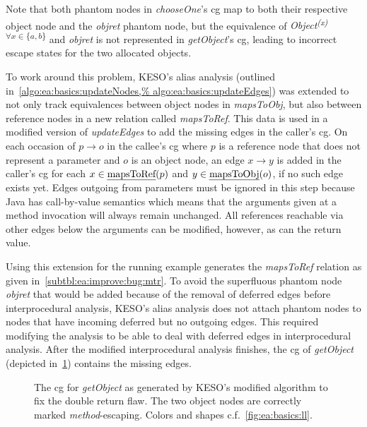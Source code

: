 			Note that both phantom nodes in \emph{chooseOne}'s \gls{cg} map to both their respective object node and the
			\emph{objret} phantom node, but the equivalence of \emph{Object\textsuperscript{(x) $\forall x \in \{a,b\}$}} and
			\emph{objret} is not represented in \emph{getObject}'s \gls{cg}, leading to incorrect escape states for the two
			allocated objects.

			To work around this problem, KESO's alias analysis (outlined in~\cref{algo:ea:basics:updateNodes,%
			algo:ea:basics:updateEdges}) was extended to not only track equivalences between object nodes in \emph{mapsToObj},
			but also between reference nodes in a new relation called \emph{mapsToRef}. This data is used in a modified
			version of \emph{updateEdges} to add the missing edges in the caller's \gls{cg}. On each occasion of
				$p \rightarrow o$
			in the callee's \gls{cg} where $p$ is a reference node that does not represent a parameter and $o$ is an object
			node, an edge
				$x \rightarrow y$
			is added in the caller's \gls{cg} for each
				$x \in \text{\emph{mapsToRef}}(p)$ and $y \in \text{\emph{mapsToObj}}(o)$,
			if no such edge exists yet. Edges outgoing from parameters must be ignored in this step because Java has
			call-by-value semantics which means that the arguments given at a method invocation will always remain unchanged.
			All references reachable via other edges below the arguments can be modified, however, as can the return value.

			Using this extension for the running example generates the \emph{mapsToRef} relation as given
			in~\cref{subtbl:ea:improve:bug:mtr}. To avoid the superfluous phantom node \emph{objret} that would be added
			because of the removal of deferred edges before interprocedural analysis, KESO's alias analysis does not attach
			phantom nodes to nodes that have incoming deferred but no outgoing edges. This required modifying the analysis to
			be able to deal with deferred edges in interprocedural analysis. After the modified interprocedural analysis
			finishes, the \gls{cg} of \emph{getObject} (depicted in~\cref{fig:ea:improve:bug:fix}) contains the missing edges.

			\begin{figure}
				\centering%

				\caption[The \gls{cg} for \emph{getObject} with the double return flaw fixed]{%
					The \gls{cg} for \emph{getObject} as generated by KESO's modified algorithm to fix the double return flaw. The
					two object nodes are correctly marked \emph{method}-escaping. Colors and shapes c.f.~\cref{fig:ea:basics:ll}.}%
				\label{fig:ea:improve:bug:fix}%
			\end{figure}

